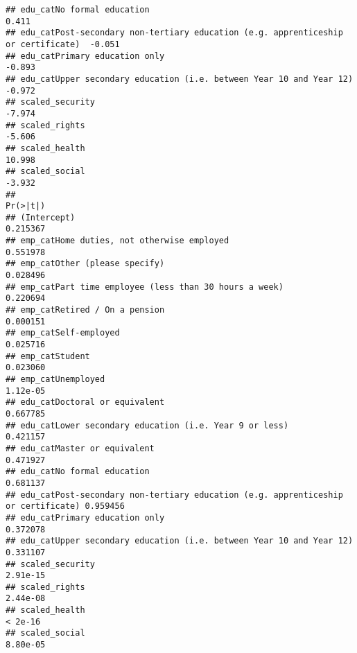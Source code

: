 \documentclass[
]{article}
\begin{document}
\begin{verbatim}
## edu_catNo formal education                                                          0.411
## edu_catPost-secondary non-tertiary education (e.g. apprenticeship or certificate)  -0.051
## edu_catPrimary education only                                                      -0.893
## edu_catUpper secondary education (i.e. between Year 10 and Year 12)                -0.972
## scaled_security                                                                    -7.974
## scaled_rights                                                                      -5.606
## scaled_health                                                                      10.998
## scaled_social                                                                      -3.932
##                                                                                   Pr(>|t|)
## (Intercept)                                                                       0.215367
## emp_catHome duties, not otherwise employed                                        0.551978
## emp_catOther (please specify)                                                     0.028496
## emp_catPart time employee (less than 30 hours a week)                             0.220694
## emp_catRetired / On a pension                                                     0.000151
## emp_catSelf-employed                                                              0.025716
## emp_catStudent                                                                    0.023060
## emp_catUnemployed                                                                 1.12e-05
## edu_catDoctoral or equivalent                                                     0.667785
## edu_catLower secondary education (i.e. Year 9 or less)                            0.421157
## edu_catMaster or equivalent                                                       0.471927
## edu_catNo formal education                                                        0.681137
## edu_catPost-secondary non-tertiary education (e.g. apprenticeship or certificate) 0.959456
## edu_catPrimary education only                                                     0.372078
## edu_catUpper secondary education (i.e. between Year 10 and Year 12)               0.331107
## scaled_security                                                                   2.91e-15
## scaled_rights                                                                     2.44e-08
## scaled_health                                                                      < 2e-16
## scaled_social                                                                     8.80e-05

\end{verbatim}
\end{document}
